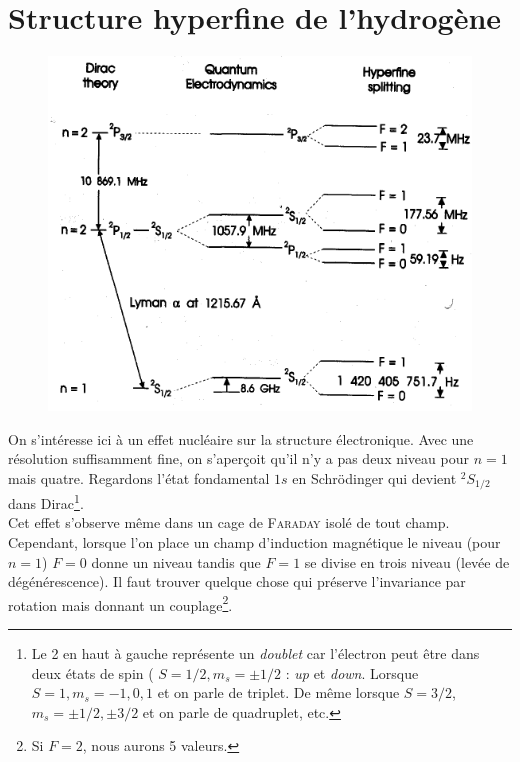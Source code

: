 \section{Structure hyperfine de l'hydrogène}
	\begin{figure}
	\vspace{-5mm}
	\includegraphics[scale=0.5]{ch1/image11}
	\end{figure}
On s'intéresse ici à un effet nucléaire sur la structure électronique. Avec une résolution 
suffisamment fine, on s'aperçoit qu'il n'y a pas deux niveau pour $n=1$ mais quatre. Regardons
l'état fondamental $1s$ en Schrödinger qui devient $^2S_{1/2}$ dans Dirac\footnote{Le 2 en haut à 
gauche représente un \textit{doublet} car l'électron peut être dans deux états de spin (
$S=1/2, m_s =\pm1/2$ : \textit{up} et \textit{down}. Lorsque $S=1, m_s=-1,0,1$ et on parle de triplet.
De même lorsque $S=3/2$, $m_s = \pm 1/2, \pm 3/2$ et on parle de quadruplet, etc. }. \\

Cet effet s'observe même dans un cage de \textsc{Faraday} isolé de tout champ. Cependant, lorsque
l'on place un champ d'induction magnétique le niveau (pour $n=1$) $F=0$ donne un niveau tandis que
$F=1$ se divise en trois niveau (levée de dégénérescence). Il faut trouver quelque chose qui 
préserve l'invariance par rotation mais donnant un couplage\footnote{Si $F=2$, nous aurons 5 
valeurs.}. \\

